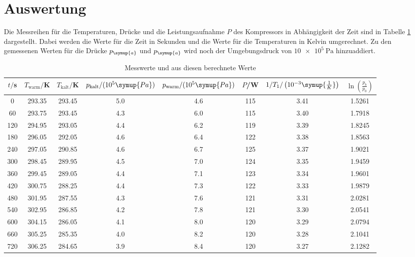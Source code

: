 \section{Auswertung}
\label{sec:Auswertung}
Die Messreihen für die Temperaturen, Drücke und die Leistungsaufnahme $P$ des Kompressors
in Abhängigkeit der Zeit sind in Tabelle \ref{tab:messwerte} dargestellt. Dabei
werden die Werte für die Zeit in Sekunden und die Werte für die Temperaturen in Kelvin
umgerechnet. Zu den gemessenen Werten für die Drücke $p_{\symup{a}}$ und
$p_{\symup{a}}$ wird noch der Umgebungsdruck von $\SI{10e5}{\pascal}$ hinzuaddiert.

\begin{table}[H]
  \centering
  \caption{Messwerte und aus diesen berechnete Werte}
  \label{tab:messwerte}
  \begin{tabular}{c c c c c c c c}
    \toprule
    $t/$s & $T_{\text{warm}}/$K & $T_{\text{kalt}}/$K & $p_{\text{kalt}}/(10^{5}\symup{Pa})$ & $p_{\text{warm}}/(10^{5}\symup{Pa})$ &
    $P$/W & $1/T_1/\left(10^{-3}\symup{\frac{1}{K}}\right)$ & $\ln\left(\frac{p_b}{p_0}\right)$ \\
    \midrule
    0	    &  293.35	 & 	293.45 	&	 5.0	&  4.6   &  115  &  3.41	&   1.5261  \\
    60    &	 293.75  & 	293.45 	&	 4.3	&  6.0   & 	115	 &  3.40 	&   1.7918  \\
    120   &	 294.95  & 	293.05	&	 4.4	&  6.2   & 	119  &	3.39 	&   1.8245 \\
    180	  &  296.05  & 	292.05	&	 4.6	&  6.4   & 	122	 &  3.38 	&   1.8563  \\
    240	  &  297.05  & 	290.85	&	 4.6	&  6.7	 &  125	 &  3.37 	&   1.9021 \\
    300	  &  298.45  & 	289.95	&	 4.5	&  7.0	 &  124  &	3.35	&   1.9459 \\
    360	  &  299.45  & 	289.05	&	 4.4	&  7.1 	 &  123	 &  3.34	&   1.9601 \\
    420	  &  300.75  & 	288.25	&	 4.4	&  7.3	 &  122  &	3.33	&   1.9879 \\
    480	  &  301.95  & 	287.55	&	 4.3	&  7.6 	 &  121	 &  3.31	&   2.0281 \\
    540	  &  302.95  & 	286.85	&	 4.2	&  7.8 	 &  121  &	3.30	&   2.0541  \\
    600   &	 304.15  & 	286.05	&	 4.1	&  8.0	 &  120	 &  3.29	&   2.0794  \\
    660   &	 305.25  & 	285.35	&	 4.0	&  8.2 	 &  120	 &  3.28	&   2.1041 \\
    720   &	 306.25  & 	284.65	&	 3.9	&  8.4	 &  120  &	3.27	&   2.1282 \\

\end{tabular}
\end{table}
